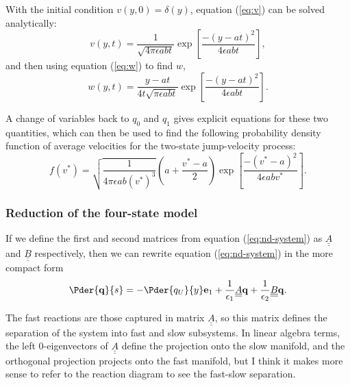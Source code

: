 With the initial condition $v(y, 0) = \delta(y)$, equation
(\ref{eq:v}) can be solved analytically:
\begin{equation}
  \label{eq:v-soln}
  v(y, t) = \frac{1}{\sqrt{4 \pi \epsilon a b t}} \exp \left[ \frac{-(y
      - at)^2}{4 \epsilon a b t} \right],
\end{equation}
and then using equation (\ref{eq:w}) to find $w$,
\begin{equation}
  \label{eq:w-soln}
  w(y, t) = \frac{y - at}{4t\sqrt{\pi \epsilon a b t}} \exp \left[ \frac{-(y
      - at)^2}{4 \epsilon a b t} \right].
\end{equation}

A change of variables back to $q_0$ and $q_1$ gives explicit equations
for these two quantities, which can then be used to find the following
probability density function of average velocities for the two-state
jump-velocity process:
\begin{equation}
  \label{eq:avg-vel-pdf}
  f\left(v^*\right) = \sqrt{\frac{1}{4\pi \epsilon a b
      \left(v^*\right)^3}} \left(a + \frac{v^* - a}{2}\right)
  \exp\left[\frac{-\left(v^* - a\right)^2}{4\epsilon a b v^*}\right].
\end{equation}

\subsubsection{Reduction of the four-state model}
\label{sec:reduction-four-state}

If we define the first and second matrices from equation
(\ref{eq:nd-system}) as $\underline{\underline{A}}$ and
$\underline{\underline{B}}$ respectively, then we can rewrite equation
(\ref{eq:nd-system}) in the more compact form
\begin{equation}
  \label{eq:four-par-ad-fp}
  \Pder{\mathbf{q}}{s} = - \Pder{q_{U}}{y} \mathbf{e}_1 +
  \frac{1}{\epsilon_1} \underline{\underline{A}}\mathbf{q} +
  \frac{1}{\epsilon_2} \underline{\underline{B}}\mathbf{q}.
\end{equation}

The fast reactions are those captured in matrix
$\underline{\underline{A}}$, so this matrix defines the separation of
the system into fast and slow subsystems. In linear algebra terms, the
left 0-eigenvectors of $\underline{\underline{A}}$ define the
projection onto the slow manifold, and the orthogonal projection
projects onto the fast manifold, but I think it makes more sense to
refer to the reaction diagram to see the fast-slow
separation.

